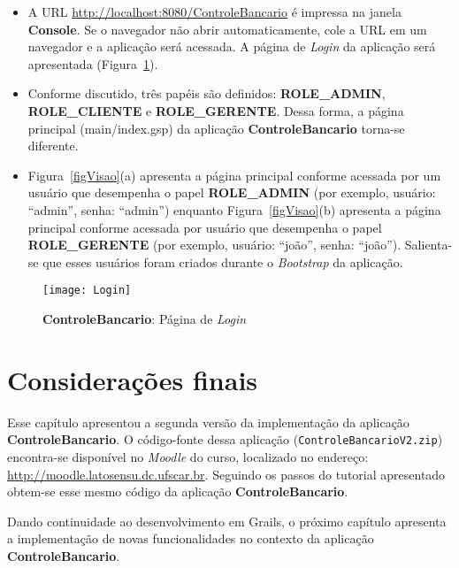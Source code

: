 \begin{itemize}

\item   A   URL  {\footnotesize\url{http://localhost:8080/ControleBancario}}   é
  impressa na  janela {\bf Console}.  Se o navegador não  abrir automaticamente,
  cole a  URL em um  navegador e  a aplicação será  acessada.  A página  de {\it
    Login} da aplicação será apresentada (Figura~\ref{figExecutar}).

\vspace{0.3cm}

\item  Conforme discutido, três  papéis são  definidos: {\bf  ROLE\_ADMIN}, {\bf
  ROLE\_CLIENTE}  e  {\bf  ROLE\_GERENTE}.   Dessa  forma,  a  página  principal
  (main/index.gsp)     da    aplicação    {\bf     ControleBancario}    torna-se
  diferente.  

\vspace{0.3cm}

\item  Figura~\ref{figVisao}(a) apresenta a  página principal  conforme acessada
  por um usuário que desempenha o papel {\bf ROLE\_ADMIN} (por exemplo, usuário:
  ``admin'',  senha: ``admin'')  enquanto  Figura~\ref{figVisao}(b) apresenta  a
  página principal  conforme acessada  por usuário que  desempenha o  papel {\bf
    ROLE\_GERENTE}      (por     exemplo,     usuário:      ``joão'',     senha:
  ``joão'').  Salienta-se  que  esses  usuários  foram criados  durante  o  {\it
    Bootstrap} da aplicação.

\end{itemize}

\vspace{0.2cm}

\begin{figure}[htbp]
\centering\texttt{[image: Login]}
\caption{{\bf ControleBancario}: Página de {\it Login}}
\label{figExecutar}
\end{figure}

\section{Considerações finais}

\vspace{0.3cm}

Esse capítulo  apresentou a  segunda versão da  implementação da  aplicação {\bf
  ControleBancario}.         O        código-fonte        dessa        aplicação
({\footnotesize\texttt{ControleBancarioV2.zip}}) encontra-se  disponível no {\it
  Moodle}         do        curso,        localizado         no        endereço:
{\footnotesize\url{http://moodle.latosensu.dc.ufscar.br}}. Seguindo os passos do
tutorial   apresentado   obtem-se   esse   mesmo  código   da   aplicação   {\bf
  ControleBancario}.  

Dando continuidade ao desenvolvimento em  Grails, o próximo capítulo apresenta a
implementação   de  novas   funcionalidades  no   contexto  da   aplicação  {\bf
  ControleBancario}. 
